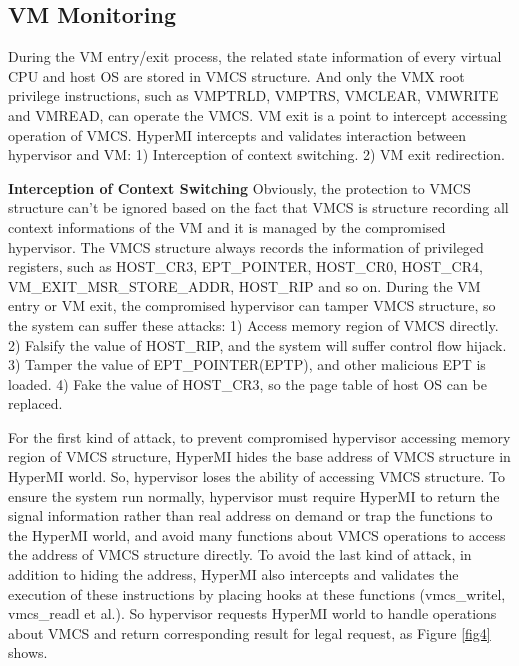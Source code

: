 \documentclass[conference]{IEEEtran}
\begin{document}



\subsection{VM Monitoring}

During the VM entry/exit process, the related state information of every virtual CPU and host OS are stored in VMCS structure. 
And only the VMX root privilege instructions, such as VMPTRLD, VMPTRS, VMCLEAR, VMWRITE and VMREAD, can operate the VMCS.
VM exit is a point to intercept accessing operation of VMCS. HyperMI intercepts and validates interaction between hypervisor and VM: 1) Interception of context switching. 2) VM exit redirection.

\textbf{Interception of Context Switching}
Obviously, the protection to VMCS structure can't be ignored based on the fact that VMCS is structure recording all context informations of the VM and it is managed by the compromised hypervisor. 
The VMCS structure always records the information of privileged registers, such as HOST\_CR3, EPT\_POINTER, HOST\_CR0, HOST\_CR4, VM\_EXIT\_MSR\_STORE\_ADDR, HOST\_RIP and so on. During the VM entry or VM exit, the compromised hypervisor can tamper VMCS structure, so the system can suffer these attacks: 1) Access memory region of VMCS directly. 2) Falsify the value of HOST\_RIP, and the system will suffer control flow hijack. 3) Tamper the value of EPT\_POINTER(EPTP), and other malicious EPT is loaded. 4) Fake the value of HOST\_CR3, so the page table of host OS can be replaced.

For the first kind of attack, to prevent compromised hypervisor accessing memory region of VMCS structure, HyperMI hides the base address of VMCS structure in HyperMI world. So, hypervisor loses the ability of accessing VMCS structure. To ensure the system run normally, hypervisor must require HyperMI to return the signal information rather than real address on demand or trap the functions to the HyperMI world, and avoid many functions about VMCS operations to access the address of VMCS structure directly. To avoid the last kind of attack, in addition to hiding the address, HyperMI also intercepts and validates the execution of these instructions by placing hooks at these functions (vmcs\_writel, vmcs\_readl et al.). So hypervisor requests HyperMI world to handle operations about VMCS and return corresponding result for legal request, as Figure \ref{fig4} shows.
\end{document}
